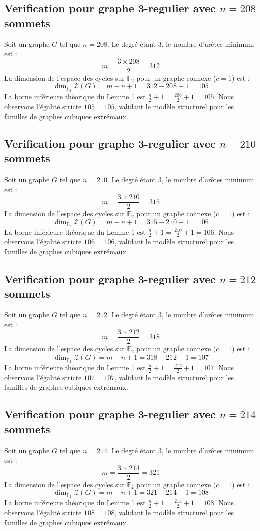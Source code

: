 \documentclass[11pt,a4paper]{article}
\begin{document}
\subsection{Verification pour graphe 3-regulier avec $n=208$ sommets}
Soit un graphe $G$ tel que $n = 208$. Le degré étant 3, le nombre d'arêtes minimum est :
$$ m = \frac{3 \times 208}{2} = 312 $$
La dimension de l'espace des cycles sur $\mathbb{F}_2$ pour un graphe connexe ($c=1$) est :
$$ \dim_{\mathbb{F}_2} \mathcal{Z}(G) = m - n + 1 = 312 - 208 + 1 = 105 $$
La borne inférieure théorique du Lemme 1 est $\frac{n}{2} + 1 = \frac{208}{2} + 1 = 105$.
Nous observons l'égalité stricte $105 = 105$, validant le modèle structurel pour les familles de graphes cubiques extrémaux.

\subsection{Verification pour graphe 3-regulier avec $n=210$ sommets}
Soit un graphe $G$ tel que $n = 210$. Le degré étant 3, le nombre d'arêtes minimum est :
$$ m = \frac{3 \times 210}{2} = 315 $$
La dimension de l'espace des cycles sur $\mathbb{F}_2$ pour un graphe connexe ($c=1$) est :
$$ \dim_{\mathbb{F}_2} \mathcal{Z}(G) = m - n + 1 = 315 - 210 + 1 = 106 $$
La borne inférieure théorique du Lemme 1 est $\frac{n}{2} + 1 = \frac{210}{2} + 1 = 106$.
Nous observons l'égalité stricte $106 = 106$, validant le modèle structurel pour les familles de graphes cubiques extrémaux.

\subsection{Verification pour graphe 3-regulier avec $n=212$ sommets}
Soit un graphe $G$ tel que $n = 212$. Le degré étant 3, le nombre d'arêtes minimum est :
$$ m = \frac{3 \times 212}{2} = 318 $$
La dimension de l'espace des cycles sur $\mathbb{F}_2$ pour un graphe connexe ($c=1$) est :
$$ \dim_{\mathbb{F}_2} \mathcal{Z}(G) = m - n + 1 = 318 - 212 + 1 = 107 $$
La borne inférieure théorique du Lemme 1 est $\frac{n}{2} + 1 = \frac{212}{2} + 1 = 107$.
Nous observons l'égalité stricte $107 = 107$, validant le modèle structurel pour les familles de graphes cubiques extrémaux.

\subsection{Verification pour graphe 3-regulier avec $n=214$ sommets}
Soit un graphe $G$ tel que $n = 214$. Le degré étant 3, le nombre d'arêtes minimum est :
$$ m = \frac{3 \times 214}{2} = 321 $$
La dimension de l'espace des cycles sur $\mathbb{F}_2$ pour un graphe connexe ($c=1$) est :
$$ \dim_{\mathbb{F}_2} \mathcal{Z}(G) = m - n + 1 = 321 - 214 + 1 = 108 $$
La borne inférieure théorique du Lemme 1 est $\frac{n}{2} + 1 = \frac{214}{2} + 1 = 108$.
Nous observons l'égalité stricte $108 = 108$, validant le modèle structurel pour les familles de graphes cubiques extrémaux.
\end{document}
